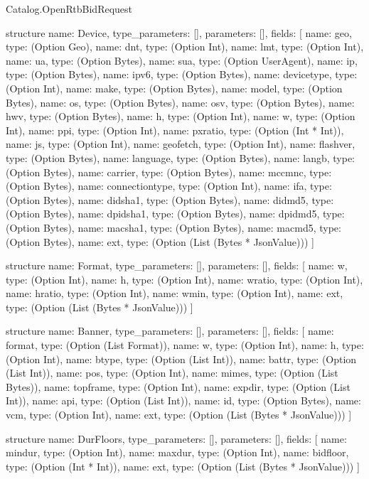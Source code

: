 \begin{lexlean}{Catalog.OpenRtbBidRequest}
\begin{semanticmodule}
structure{
  name: Device,
  type_parameters: [],
  parameters: [],
  fields: [
    {name: geo, type: (Option Geo)},
    {name: dnt, type: (Option Int)},
    {name: lmt, type: (Option Int)},
    {name: ua, type: (Option Bytes)},
    {name: sua, type: (Option UserAgent)},
    {name: ip, type: (Option Bytes)},
    {name: ipv6, type: (Option Bytes)},
    {name: devicetype, type: (Option Int)},
    {name: make, type: (Option Bytes)},
    {name: model, type: (Option Bytes)},
    {name: os, type: (Option Bytes)},
    {name: osv, type: (Option Bytes)},
    {name: hwv, type: (Option Bytes)},
    {name: h, type: (Option Int)},
    {name: w, type: (Option Int)},
    {name: ppi, type: (Option Int)},
    {name: pxratio, type: (Option (Int * Int))},
    {name: js, type: (Option Int)},
    {name: geofetch, type: (Option Int)},
    {name: flashver, type: (Option Bytes)},
    {name: language, type: (Option Bytes)},
    {name: langb, type: (Option Bytes)},
    {name: carrier, type: (Option Bytes)},
    {name: mccmnc, type: (Option Bytes)},
    {name: connectiontype, type: (Option Int)},
    {name: ifa, type: (Option Bytes)},
    {name: didsha1, type: (Option Bytes)},
    {name: didmd5, type: (Option Bytes)},
    {name: dpidsha1, type: (Option Bytes)},
    {name: dpidmd5, type: (Option Bytes)},
    {name: macsha1, type: (Option Bytes)},
    {name: macmd5, type: (Option Bytes)},
    {name: ext, type: (Option (List (Bytes * JsonValue)))}
  ]
}

structure{
  name: Format,
  type_parameters: [],
  parameters: [],
  fields: [
    {name: w, type: (Option Int)},
    {name: h, type: (Option Int)},
    {name: wratio, type: (Option Int)},
    {name: hratio, type: (Option Int)},
    {name: wmin, type: (Option Int)},
    {name: ext, type: (Option (List (Bytes * JsonValue)))}
  ]
}

structure{
  name: Banner,
  type_parameters: [],
  parameters: [],
  fields: [
    {name: format, type: (Option (List Format))},
    {name: w, type: (Option Int)},
    {name: h, type: (Option Int)},
    {name: btype, type: (Option (List Int))},
    {name: battr, type: (Option (List Int))},
    {name: pos, type: (Option Int)},
    {name: mimes, type: (Option (List Bytes))},
    {name: topframe, type: (Option Int)},
    {name: expdir, type: (Option (List Int))},
    {name: api, type: (Option (List Int))},
    {name: id, type: (Option Bytes)},
    {name: vcm, type: (Option Int)},
    {name: ext, type: (Option (List (Bytes * JsonValue)))}
  ]
}

structure{
  name: DurFloors,
  type_parameters: [],
  parameters: [],
  fields: [
    {name: mindur, type: (Option Int)},
    {name: maxdur, type: (Option Int)},
    {name: bidfloor, type: (Option (Int * Int))},
    {name: ext, type: (Option (List (Bytes * JsonValue)))}
  ]
}


\end{semanticmodule}
\end{lexlean}
